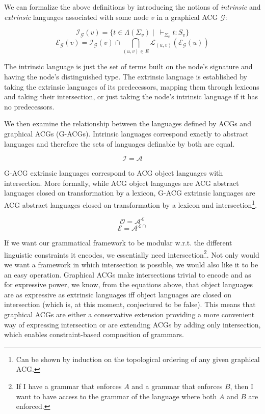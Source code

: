 \documentclass{llncs}
\begin{document}
We can formalize the above definitions by introducing the notions of
\emph{intrinsic} and \emph{extrinsic} languages associated with some node $v$
in a graphical ACG $\mathcal{G}$:

$$
\mathcal{I}_{\mathcal{G}}(v) = \{t \in \Lambda(\Sigma_v)
\mid\ \vdash_{\Sigma_v} t : S_v\}
$$
$$
\mathcal{E}_{\mathcal{G}}(v) = \mathcal{I}_{\mathcal{G}}(v) \cap
\bigcap_{(u,v) \in E} \mathcal{L}_{(u,v)}(\mathcal{E}_{\mathcal{G}}(u))
$$

The intrinsic language is just the set of terms built on the node's
signature and having the node's distinguished type. The extrinsic
language is established by taking the extrinsic languages of its
predecessors, mapping them through lexicons and taking their
intersection, or just taking the node's intrinsic language if it has no
predecessors.

We then examine the relationship between the languages defined by ACGs
and graphical ACGs (G-ACGs). Intrinsic languages correspond exactly to
abstract languages and therefore the sets of languages definable by both
are equal.

$$
\mathcal{I} = \mathcal{A}
$$

G-ACG extrinsic languages correspond to ACG object languages with
intersection. More formally, while ACG object languages are ACG abstract
languages closed on transformation by a lexicon, G-ACG extrinsic languages are
ACG abstract languages closed on transformation by a lexicon and
intersection\footnote{Can be shown by induction on the topological ordering of
  any given graphical ACG.}.

$$
\mathcal{O} = \mathcal{A}^{\mathcal{L}}
$$
$$
\mathcal{E} = \mathcal{A}^{\mathcal{L}{\cap}}
$$

If we want our grammatical framework to be modular w.r.t. the different
linguistic constraints it encodes, we essentially need
intersection\footnote{If I have a grammar that enforces $A$ and a grammar that
  enforces $B$, then I want to have access to the grammar of the language
  where both $A$ and $B$ are enforced.}. Not only would we want a framework in
which intersection is possible, we would also like it to be an easy
operation. Graphical ACGs make intersections trivial to encode and as for
expressive power, we know, from the equations above, that object languages are
as expressive as extrinsic languages iff object languages are closed on
intersection (which is, at this moment, conjectured to be false). This means
that graphical ACGs are either a conservative extension providing a more
convenient way of expressing intersection or are extending ACGs by adding
only intersection, which enables constraint-based composition of grammars. 
\end{document}
